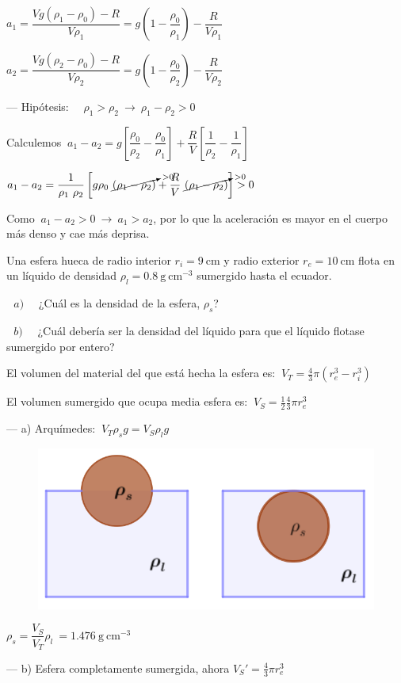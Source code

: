$a_1=\dfrac{Vg(\rho_1-\rho_0)-R}{V\rho_1}=g \left( 1-\dfrac{\rho_0}{\rho_1} \right)-\dfrac{R}{V\rho_1}$

$a_2=\dfrac{Vg(\rho_2-\rho_0)-R}{V\rho_2}=g \left( 1-\dfrac{\rho_0}{\rho_2} \right)-\dfrac{R}{V\rho_2}$


--- Hipótesis: $\quad \rho_1>\rho_2\ \to \ \rho_1-\rho_2>0 $

Calculemos $\ a_1-a_2=g\left[ \dfrac{\rho_0}{\rho_2}-\dfrac{\rho_0}{\rho_1} \right]+\dfrac R V \left[ \dfrac{1}{\rho_2}-\dfrac{1}{\rho_1} \right]$

$a_1-a_2=
\dfrac{1}{\rho_1\ \rho_2} \left[ g\rho_0\ \cancelto{>0}{(\rho_1-\rho_2)}+\dfrac R V \ \cancelto{>0}{(\rho_1-\rho_2)} \right]>0$

Como $\ a_1-a_2>0 \  \to \ a_1>a_2$, por lo que la aceleración es mayor en el cuerpo más denso y cae más deprisa.


\begin{prob}
Una esfera hueca de radio interior $r_i=9\ \mathrm{cm}$ y radio exterior $r_e=10\ \mathrm{cm}$ flota en un líquido de densidad $\rho_l	= 0.8 \ \mathrm{g\ cm}^{-3}$ sumergido hasta el ecuador. 

$\ \ \ a)\quad$ ¿Cuál es la densidad de la esfera, $\rho_s$?

$\ \ \ b)\quad$ ¿Cuál debería ser la densidad del líquido para que el líquido flotase sumergido por entero?
\end{prob}

\begin{multicols}{2}
El volumen del material del que está hecha la esfera es:
$\ V_T=\frac 4 3 \pi (r_e^3-r_i^3)$

El volumen sumergido que ocupa media esfera es:
$\ V_S=\frac 1 2 \frac 4 3 \pi r_e^3$

--- a) Arquímedes: $\ V_T\rho_s g=V_S \rho_l g$
\begin{figure}[H]
	\centering
	\includegraphics[width=.5\textwidth]{imagenes/imagenes07/T07IM23.png}
\end{figure}
\end{multicols}
$\rho_s = \dfrac{V_S}{V_T}\rho_l \ =1.476\ \mathrm{g\ cm}^{-3}$ 

--- b) Esfera completamente sumergida, ahora $V_S'=\frac 4 3 \pi r_e^3$

